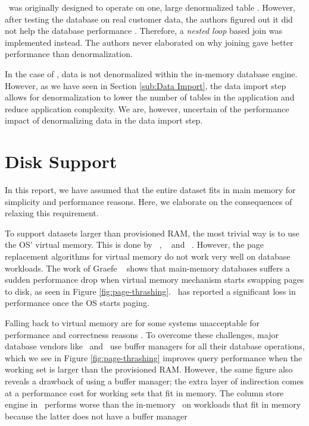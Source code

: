 \blink~was originally designed to operate on one, large denormalized table \cite{Johnson2008-cp}. However, after testing the database on real customer data, the authors figured out it did not help the database performance \cite{Barber2012-xt}. Therefore, a \textit{nested loop} based join was implemented instead. The authors never elaborated on why joining gave better performance than denormalization.

In the case of \qlikview, data is not denormalized within the in-memory database engine. However, as we have seen in Section \ref{sub:Data Import}, the data import step allows for denormalization to lower the number of tables in the application and reduce application complexity. We are, however, uncertain of the performance impact of denormalizing data in the data import step. 

\section{Disk Support}
\label{sec:Disk Support}


In this report, we have assumed that the entire dataset fits in main memory for simplicity and performance reasons. Here, we elaborate on the consequences of relaxing this requirement. 

To support datasets larger than provisioned RAM, the most trivial way is to use the OS' virtual memory. This is done by \monetdb~\cite{Boncz2002-yj}, \blink~\cite{Barber2014-ey} and \qlikview~\cite{Qlik2011-ef}. However, the page replacement algorithms for virtual memory do not work very well on database workloads. The work of Graefe \ea~\cite{Graefe2014-ds} shows that main-memory databases suffers a sudden performance drop when virtual memory mechanism starts swapping pages to disk, as seen in Figure \ref{fig:page-thrashing}. \qlikview~has reported a significant loss in performance once the OS starts paging. 

Falling back to virtual memory are for some systems unacceptable for performance and correctness reasons \cite{Graefe2014-ds}. To overcome these challenges, major database vendors like \oracle~and \mssql~use buffer managers for all their database operations, which we see in Figure \ref{fig:page-thrashing} improves query performance when the working set is larger than the provisioned RAM. However, the same figure also reveals a drawback of using a buffer manager; the extra layer of indirection comes at a performance cost for working sets that fit in memory. The column store engine in \mssql~performs worse than the in-memory \vertipaq~on workloads that fit in memory because the latter does not have a buffer manager \cite{Ferrari2012-hm}

